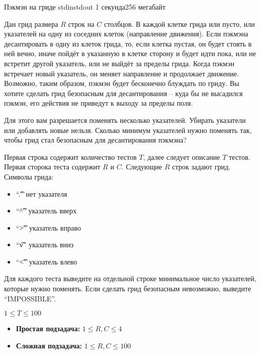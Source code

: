 
\begin{problem}{Пэкмэн на гриде}
{stdin}{stdout}
{1 секунда}{256 мегабайт}{}

Дан грид размера $R$ строк на $C$ столбцов. В каждой клетке грида
или пусто, или указателей на одну из соседних клеток (направление движения).
Если пэкмэна десантировать в одну из клеток грида, то, если клетка пустая, он будет стоять в ней вечно,
иначе пойдёт в указанную в клетке сторону и будет идти пока, или не встретит другой указатель, или
не выйдёт за пределы грида. Когда пэкмэн встречает новый указатель, он меняет направление и продолжает движение.
Возможно, таким образом, пэкмэн будет бесконечно блуждать по гриду.
Вы хотите сделать грид безопасным для десантирования -- куда бы не высадился пэкмэн, его
действия не приведут к выходу за пределы поля.

Для этого вам разрешается поменять несколько указателей. Убирать указатели или добавлять новые нельзя.
Сколько минимум указателей нужно поменять так, чтобы грид стал безопасным для десантирования пэкмэна?

\InputFile

Первая строка содержит количество тестов $T$, далее следует описание $T$ тестов.
Первая сторока теста содержит $R$ и $C$. 
Следующие $R$ строк задают грид.
Символы грида:
\begin{itemize}
  \item ``\t{.}'' нет указателя
  \item ``\t{\^{}}'' указатель вверх
  \item ``\t{>}'' указатель  вправо
  \item ``\t{v}'' указатель  вниз
  \item ``\t{<}'' указатель влево
\end{itemize}

\OutputFile

Для каждого теста выведите на отдельной строке минимальное 
число указателей, которые нужно поменять.
Если сделать грид безопасным невозможно, выведите ``IMPOSSIBLE''.

\Scoring

$1 \le T \le 100$
\begin{itemize}
  \item {\bf Простая подзадача:} $1 \le R, C \le 4$
  \item {\bf Сложная подзадача:} $1 \le R, C \le 100$
\end{itemize}

\Examples

\begin{example}
%
\end{example}

\end{problem}

